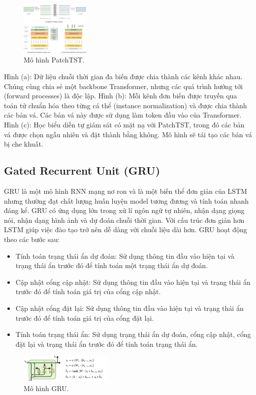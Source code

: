 \documentclass[conference]{IEEEtran}
\begin{document}
\begin{figure}[H]
    \centering
    \includegraphics[width=0.3\textwidth]{bibliography/pictures/modelPatchTST.png}
    \caption{Mô hình PatchTST.}
\end{figure}
Hình (a): Dữ liệu chuỗi thời gian đa biến được chia thành các kênh khác nhau. Chúng cùng chia sẻ một backbone Transformer, nhưng các quá trình hướng tới (forward processes) là độc lập.
Hình (b): Mỗi kênh đơn biến được truyền qua toán tử chuẩn hóa theo từng cá thể (instance normalization) và được chia thành các bản vá. Các bản vá này được sử dụng làm token đầu vào của Transformer.
Hình (c): Học biểu diễn tự giám sát có mặt nạ với PatchTST, trong đó các bản vá được chọn ngẫu nhiên và đặt thành bằng không. Mô hình sẽ tái tạo các bản vá bị che khuất.

\subsection{Gated Recurrent Unit (GRU)}
GRU là một mô hình RNN mạng nơ ron và là một biến thể đơn giản của LSTM nhưng thường đạt chất lượng huấn luyện model tương đương và tính toán nhanh đáng kể. GRU có ứng dụng lớn trong xử lí ngôn ngữ tự nhiên, nhận dạng giọng nói, nhận dạng hình ảnh và dự đoán chuỗi thời gian. Với cấu trúc đơn giản hơn LSTM giúp việc đào tạo trở nên dễ dàng với chuỗi liệu dài hơn. 
GRU hoạt động theo các bước sau:
\begin{itemize}
    \item Tính toán trạng thái ẩn dự đoán: Sử dụng thông tin đầu vào hiện tại và trạng thái ẩn trước đó để tính toán một trạng thái ẩn dự đoán.
    \item Cập nhật cổng cập nhật: Sử dụng thông tin đầu vào hiện tại và trạng thái ẩn trước đó để tính toán giá trị của cổng cập nhật.
    \item Cập nhật cổng đặt lại: Sử dụng thông tin đầu vào hiện tại và trạng thái ẩn trước đó để tính toán giá trị của cổng đặt lại.
    \item Tính toán trạng thái ẩn: Sử dụng trạng thái ẩn dự đoán, cổng cập nhật, cổng đặt lại và trạng thái ẩn trước đó để tính toán trạng thái ẩn.
\end{itemize}
\begin{figure}[H]
    \centering
    \includegraphics[width=0.4\textwidth]{bibliography/pictures/GRU.png}
    \caption{Mô hình GRU.}
\end{figure}
\end{document}
